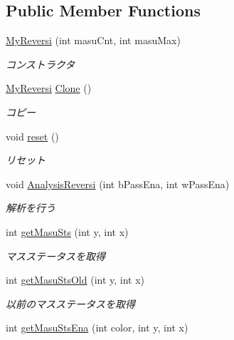 \subsection*{Public Member Functions}
\begin{DoxyCompactItemize}
\item 
\hyperlink{class_reversi_wpf_1_1_my_reversi_aff9b8ea39ef41f0d0b84cc5d52af86b2}{My\+Reversi} (int masu\+Cnt, int masu\+Max)
\begin{DoxyCompactList}\small\item\em コンストラクタ \end{DoxyCompactList}\item 
\hyperlink{class_reversi_wpf_1_1_my_reversi}{My\+Reversi} \hyperlink{class_reversi_wpf_1_1_my_reversi_aff9b97e9e4102966ea558428255974e2}{Clone} ()
\begin{DoxyCompactList}\small\item\em コピー \end{DoxyCompactList}\item 
void \hyperlink{class_reversi_wpf_1_1_my_reversi_a61b1ee2e28cc4050ebbda2e54c7a60b6}{reset} ()
\begin{DoxyCompactList}\small\item\em リセット \end{DoxyCompactList}\item 
void \hyperlink{class_reversi_wpf_1_1_my_reversi_a14a3c0720db3ff11196e0c7c34bd80c0}{Analysis\+Reversi} (int b\+Pass\+Ena, int w\+Pass\+Ena)
\begin{DoxyCompactList}\small\item\em 解析を行う \end{DoxyCompactList}\item 
int \hyperlink{class_reversi_wpf_1_1_my_reversi_a34b0c0b96b147a8d2f1dc6863cac25d8}{get\+Masu\+Sts} (int y, int x)
\begin{DoxyCompactList}\small\item\em マスステータスを取得 \end{DoxyCompactList}\item 
int \hyperlink{class_reversi_wpf_1_1_my_reversi_acdf94f106c88ded99a4c5dcbbc19be16}{get\+Masu\+Sts\+Old} (int y, int x)
\begin{DoxyCompactList}\small\item\em 以前のマスステータスを取得 \end{DoxyCompactList}\item 
int \hyperlink{class_reversi_wpf_1_1_my_reversi_ac122d3db633616259d22d8bb885c074d}{get\+Masu\+Sts\+Ena} (int color, int y, int x)

\end{DoxyCompactItemize}
